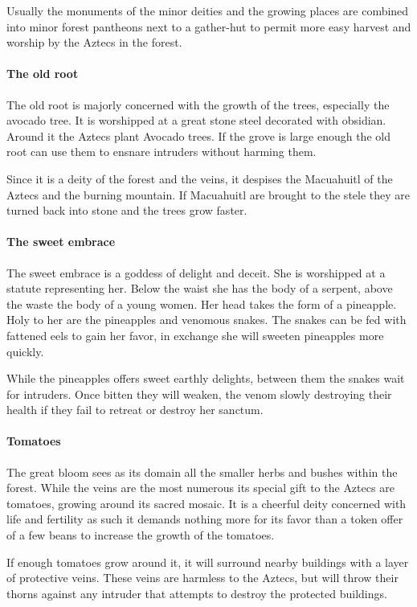 Usually the monuments of the minor deities and the growing places are combined
into minor forest pantheons next to a gather-hut to permit more easy harvest
and worship by the \gls{Aztecs} in the forest.

\paragraph{The old root}
The old root is majorly concerned with the growth of the trees, especially the
avocado tree. It is worshipped at a great stone steel decorated with obsidian.
Around it the \gls{Aztecs} plant Avocado trees. If the grove is large enough
the old root can use them to ensnare intruders without harming them.

Since it is a deity of the forest and the veins, it despises the Macuahuitl of
the \gls{Aztecs} and the burning mountain. If Macuahuitl are brought to the
stele they are turned back into stone and the trees grow faster.

\paragraph{The sweet embrace}
The sweet embrace is a goddess of delight and deceit. She is worshipped at a
statute representing her. Below the waist she has the body of a serpent, above
the waste the body of a young women. Her head takes the form of a pineapple.
Holy to her are the pineapples and venomous snakes. The snakes can be fed with
fattened eels to gain her favor, in exchange she will sweeten pineapples more
quickly.

While the pineapples offers sweet earthly delights, between them the snakes
wait for intruders. Once bitten they will weaken, the venom slowly destroying
their health if they fail to retreat or destroy her sanctum.

\paragraph{Tomatoes}
The great bloom sees as its domain all the smaller herbs and bushes within the
forest. While the veins are the most numerous its special gift to the
\gls{Aztecs} are tomatoes, growing around its sacred mosaic. It is a cheerful
deity concerned with life and fertility as such it demands nothing more for its
favor than a token offer of a few beans to increase the growth of the tomatoes.

If enough tomatoes grow around it, it will surround nearby buildings with a
layer of protective veins. These veins are harmless to the \gls{Aztecs}, but
will throw their thorns against any intruder that attempts to destroy the
protected buildings.

